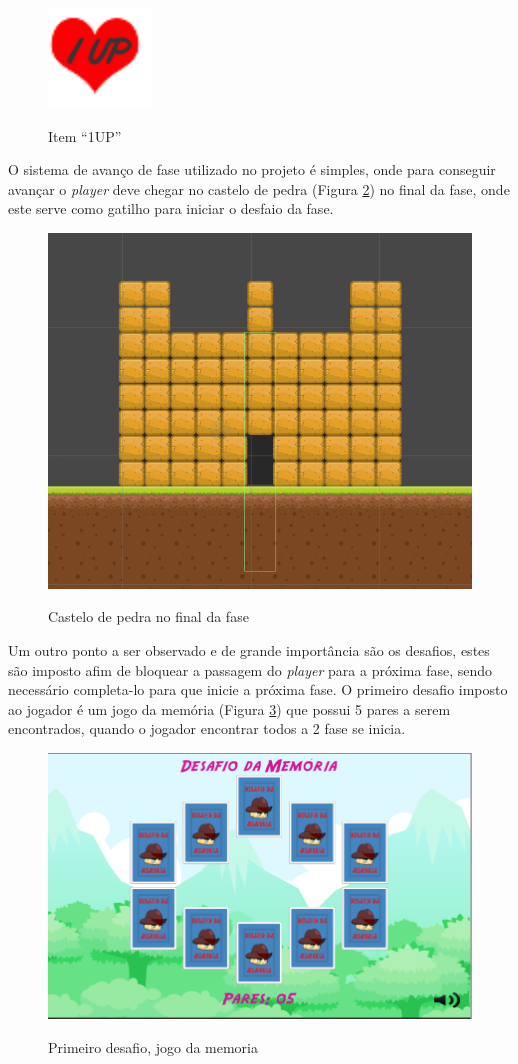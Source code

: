 \documentclass[
	12pt,				%
    oneside,			%
	a4paper,			%
	english,			%
	french,				%
	spanish,			%
	brazil,				%
	]{abntex2}
\begin{document}
		\begin{figure}[H]
			\caption{Item “1UP”}
			\centering
			\includegraphics[width=0.3\linewidth]{Imagens/22}
			\label{fig:22}
		\end{figure}		
		
		O sistema de avanço de fase utilizado no projeto é simples, onde para conseguir avançar o \textit{player} deve chegar no castelo de pedra (Figura \ref*{fig:23}) no final da fase, onde este serve como gatilho para iniciar o desfaio da fase. 
		
		\begin{figure}[H]
			\caption{Castelo de pedra no final da fase}
			\centering
			\includegraphics[width=0.7\linewidth]{Imagens/23}
			\label{fig:23}
		\end{figure}
	
		Um outro ponto a ser observado e de grande importância são os desafios, estes são imposto afim de bloquear a passagem do \textit{player} para a próxima fase, sendo necessário completa-lo para que inicie a próxima fase. O primeiro desafio imposto ao jogador é um jogo da memória (Figura \ref*{fig:25}) que possui 5 pares a serem encontrados, quando o jogador encontrar todos a 2 fase se inicia.
		
		\begin{figure}[H]
			\caption{Primeiro desafio, jogo da memoria}
			\centering
			\includegraphics[width=0.7\linewidth]{Imagens/25}
			\label{fig:25}
		\end{figure}		
		
\end{document}
